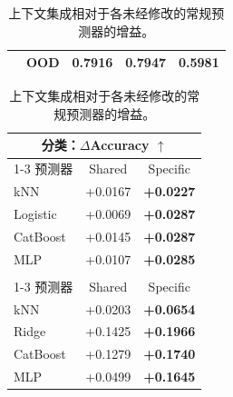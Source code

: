 \begin{table}[H]
\begin{minipage}[t]{0.61\textwidth}
\begin{tabular}{@{}llccc@{}}
           & OOD
        & \textcolor{specificred}{\textbf{0.7916}}
        & \textcolor{specificred}{\textbf{0.7947}}
        & \textcolor{specificred}{\textbf{0.5981}} \\
      \bottomrule
    \end{tabular}
  \end{minipage}\hfill
  \begin{minipage}[t]{0.36\textwidth}
    \vspace{0pt}
    \centering
    \caption{上下文集成相对于各未经修改的常规预测器的增益。}
    \label{tab:traditional-backbone-gains}
    \small
    \setlength{\tabcolsep}{4.0pt}
    \renewcommand{\arraystretch}{1.02}
    \begin{tabular}{@{}lcc@{}}
      \toprule
      \multicolumn{3}{c}{分类：$\Delta$Accuracy $\uparrow$} \\
      \cmidrule(lr){1-3}
      预测器 & Shared & Specific \\
      \midrule
      kNN & \textcolor{sharedblue}{+0.0167}
        & \textcolor{specificred}{\textbf{+0.0227}} \\
      Logistic & \textcolor{sharedblue}{+0.0069}
        & \textcolor{specificred}{\textbf{+0.0287}} \\
      CatBoost & \textcolor{sharedblue}{+0.0145}
        & \textcolor{specificred}{\textbf{+0.0287}} \\
      MLP & \textcolor{sharedblue}{+0.0107}
        & \textcolor{specificred}{\textbf{+0.0285}} \\
      \addlinespace[5pt]
      \multicolumn{3}{c}{回归：$\Delta R^2$ $\uparrow$} \\
      \cmidrule(lr){1-3}
      预测器 & Shared & Specific \\
      \midrule
      kNN & \textcolor{sharedblue}{+0.0203}
        & \textcolor{specificred}{\textbf{+0.0654}} \\
      Ridge & \textcolor{sharedblue}{+0.1425}
        & \textcolor{specificred}{\textbf{+0.1966}} \\
      CatBoost & \textcolor{sharedblue}{+0.1279}
        & \textcolor{specificred}{\textbf{+0.1740}} \\
      MLP & \textcolor{sharedblue}{+0.0499}
        & \textcolor{specificred}{\textbf{+0.1645}} \\
      \bottomrule
    \end{tabular}
  \end{minipage}
\end{table}
